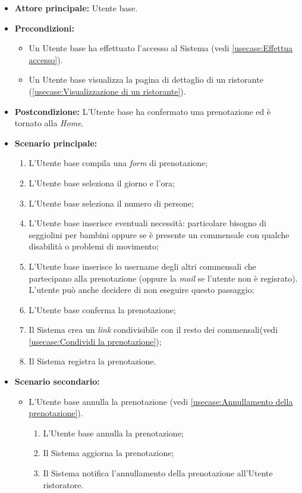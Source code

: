 \label{usecase:Prenotazione di un tavolo}
\begin{itemize}
	\item \textbf{Attore principale:} Utente base.
	\item \textbf{Precondizioni:}
		\begin{itemize}
			\item Un Utente base ha effettuato l'accesso al Sistema (vedi \autoref{usecase:Effettua accesso}).
			\item Un Utente base visualizza la pagina di dettaglio di un ristorante (\autoref{usecase:Visualizzazione di un ristorante}).
		\end{itemize}
	\item \textbf{Postcondizione:} L'Utente base ha confermato una prenotazione ed è tornato alla \textit{Home}.

	      
	\item \textbf{Scenario principale:}
	      \begin{enumerate}
		      \item L'Utente base compila una \textit{form} di prenotazione;
		      \item L'Utente base seleziona il giorno e l'ora;
		      \item L'Utente base seleziona il numero di persone;
		      \item L'Utente base inserisce eventuali necessità: particolare bisogno di seggiolini per bambini oppure se è presente un commensale con qualche disabilità o problemi di movimento;
		      \item L'Utente base inserisce lo username degli altri commensali che partecipano alla prenotazione (oppure la \textit{mail} se l'utente non è regisrato).
			  L'utente può anche decidere di non eseguire questo passaggio;
		      \item L'Utente base conferma la prenotazione;
		      \item Il Sistema crea un \textit{link} condivisibile con il resto dei commensali(vedi \autoref{usecase:Condividi la prenotazione});
		      \item Il Sistema registra la prenotazione.

	      \end{enumerate}

	\item \textbf{Scenario secondario:}
	      \begin{itemize}
		      \item L'Utente base annulla la prenotazione (vedi
		            \autoref{usecase:Annullamento della prenotazione}).
		            \begin{enumerate}
			            \item L'Utente base annulla la prenotazione;
			            \item Il Sistema aggiorna la prenotazione;
			            \item Il Sistema notifica l'annullamento della prenotazione
			                  all'Utente ristoratore.
		            \end{enumerate}
	      \end{itemize}
\end{itemize}


